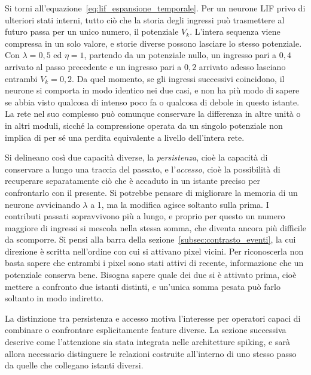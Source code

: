 Si torni all'equazione~\eqref{eq:lif_espansione_temporale}. Per un neurone LIF privo di ulteriori stati interni, tutto ciò che la storia degli ingressi può trasmettere al futuro passa per un unico numero, il potenziale $V_k$. L'intera sequenza viene compressa in un solo valore, e storie diverse possono lasciare lo stesso potenziale. Con $\lambda=0{,}5$ ed $\eta=1$, partendo da un potenziale nullo, un ingresso pari a $0{,}4$ arrivato al passo precedente e un ingresso pari a $0{,}2$ arrivato adesso lasciano entrambi $V_k=0{,}2$. Da quel momento, se gli ingressi successivi coincidono, il neurone si comporta in modo identico nei due casi, e non ha più modo di sapere se abbia visto qualcosa di intenso poco fa o qualcosa di debole in questo istante. La rete nel suo complesso può comunque conservare la differenza in altre unità o in altri moduli, sicché la compressione operata da un singolo potenziale non implica di per sé una perdita equivalente a livello dell'intera rete.

Si delineano così due capacità diverse, la \emph{persistenza}, cioè la capacità di conservare a lungo una traccia del passato, e l'\emph{accesso}, cioè la possibilità di recuperare separatamente ciò che è accaduto in un istante preciso per confrontarlo con il presente. Si potrebbe pensare di migliorare la memoria di un neurone avvicinando $\lambda$ a 1, ma la modifica agisce soltanto sulla prima. I contributi passati sopravvivono più a lungo, e proprio per questo un numero maggiore di ingressi si mescola nella stessa somma, che diventa ancora più difficile da scomporre. Si pensi alla barra della sezione~\ref{subsec:contrasto_eventi}, la cui direzione è scritta nell'ordine con cui si attivano pixel vicini. Per riconoscerla non basta sapere che entrambi i pixel sono stati attivi di recente, informazione che un potenziale conserva bene. Bisogna sapere quale dei due si è attivato prima, cioè mettere a confronto due istanti distinti, e un'unica somma pesata può farlo soltanto in modo indiretto.

La distinzione tra persistenza e accesso motiva l'interesse per operatori capaci di combinare o confrontare esplicitamente feature diverse. La sezione successiva descrive come l'attenzione sia stata integrata nelle architetture spiking, e sarà allora necessario distinguere le relazioni costruite all'interno di uno stesso passo da quelle che collegano istanti diversi.




